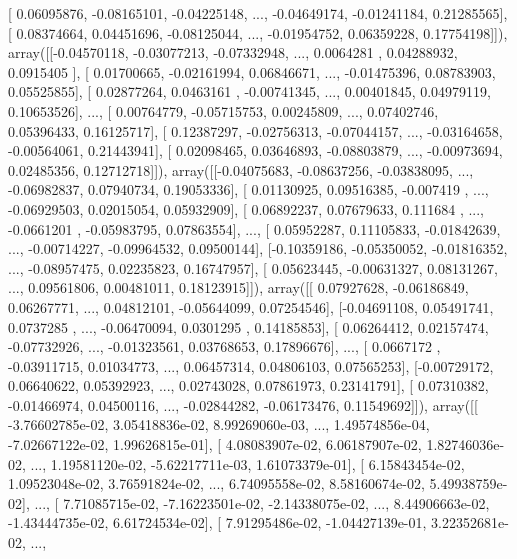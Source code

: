 \documentclass{article}
\begin{document}
       [ 0.06095876, -0.08165101, -0.04225148, ..., -0.04649174,
        -0.01241184,  0.21285565],
       [ 0.08374664,  0.04451696, -0.08125044, ..., -0.01954752,
         0.06359228,  0.17754198]]), array([[-0.04570118, -0.03077213, -0.07332948, ...,  0.0064281 ,
         0.04288932,  0.0915405 ],
       [ 0.01700665, -0.02161994,  0.06846671, ..., -0.01475396,
         0.08783903,  0.05525855],
       [ 0.02877264,  0.0463161 , -0.00741345, ...,  0.00401845,
         0.04979119,  0.10653526],
       ..., 
       [ 0.00764779, -0.05715753,  0.00245809, ...,  0.07402746,
         0.05396433,  0.16125717],
       [ 0.12387297, -0.02756313, -0.07044157, ..., -0.03164658,
        -0.00564061,  0.21443941],
       [ 0.02098465,  0.03646893, -0.08803879, ..., -0.00973694,
         0.02485356,  0.12712718]]), array([[-0.04075683, -0.08637256, -0.03838095, ..., -0.06982837,
         0.07940734,  0.19053336],
       [ 0.01130925,  0.09516385, -0.007419  , ..., -0.06929503,
         0.02015054,  0.05932909],
       [ 0.06892237,  0.07679633,  0.111684  , ..., -0.0661201 ,
        -0.05983795,  0.07863554],
       ..., 
       [ 0.05952287,  0.11105833, -0.01842639, ..., -0.00714227,
        -0.09964532,  0.09500144],
       [-0.10359186, -0.05350052, -0.01816352, ..., -0.08957475,
         0.02235823,  0.16747957],
       [ 0.05623445, -0.00631327,  0.08131267, ...,  0.09561806,
         0.00481011,  0.18123915]]), array([[ 0.07927628, -0.06186849,  0.06267771, ...,  0.04812101,
        -0.05644099,  0.07254546],
       [-0.04691108,  0.05491741,  0.0737285 , ..., -0.06470094,
         0.0301295 ,  0.14185853],
       [ 0.06264412,  0.02157474, -0.07732926, ..., -0.01323561,
         0.03768653,  0.17896676],
       ..., 
       [ 0.0667172 , -0.03911715,  0.01034773, ...,  0.06457314,
         0.04806103,  0.07565253],
       [-0.00729172,  0.06640622,  0.05392923, ...,  0.02743028,
         0.07861973,  0.23141791],
       [ 0.07310382, -0.01466974,  0.04500116, ..., -0.02844282,
        -0.06173476,  0.11549692]]), array([[ -3.76602785e-02,   3.05418836e-02,   8.99269060e-03, ...,
          1.49574856e-04,  -7.02667122e-02,   1.99626815e-01],
       [  4.08083907e-02,   6.06187907e-02,   1.82746036e-02, ...,
          1.19581120e-02,  -5.62217711e-03,   1.61073379e-01],
       [  6.15843454e-02,   1.09523048e-02,   3.76591824e-02, ...,
          6.74095558e-02,   8.58160674e-02,   5.49938759e-02],
       ..., 
       [  7.71085715e-02,  -7.16223501e-02,  -2.14338075e-02, ...,
          8.44906663e-02,  -1.43444735e-02,   6.61724534e-02],
       [  7.91295486e-02,  -1.04427139e-01,   3.22352681e-02, ...,
\end{document}
